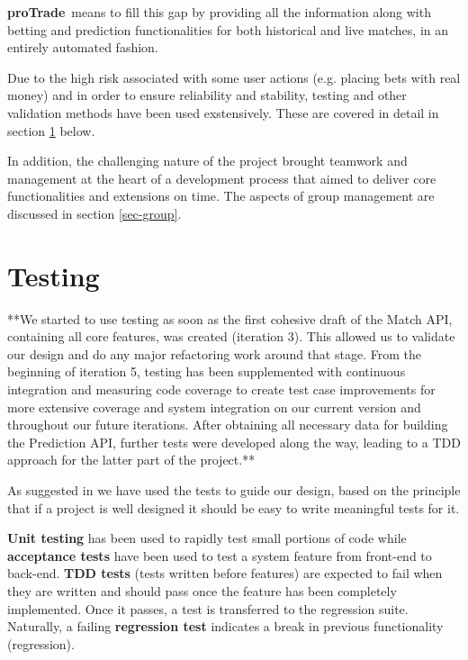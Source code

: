 \documentclass[10pt]{article}
\newcommand{\nm}{{\bf proTrade}}
\newcommand{\nmsp}{{\nm \ }}
\begin{document}
\nmsp means to fill this gap by providing all the information along with betting and prediction functionalities for both historical and live matches, in an entirely automated fashion.

Due to the high risk associated with some user actions (e.g. placing bets with real money) and in order to ensure reliability and stability, testing and other validation methods have been used exstensively. These are covered in detail in section \ref{sec-testing} below.

In addition, the challenging nature of the project brought teamwork and management at the heart of a development process that aimed to deliver core functionalities and extensions on time. The aspects of group management are discussed in section \ref{sec-group}.

\clearpage

\section{Testing}
\label{sec-testing}

**We started to use testing as soon as the first cohesive draft of the Match API, containing all core features, was created (iteration 3). This allowed us to validate our design and do any major refactoring work around that stage. From the beginning of iteration 5, testing has been supplemented with continuous integration and measuring code coverage to create test case improvements for more extensive coverage and system integration on our current version and throughout our future iterations. After obtaining all necessary data for building the Prediction API, further tests were developed along the way, leading to a TDD approach for the latter part of the project.**

As suggested in \cite{bk-testing} we have used the tests to guide our design, based on the principle that if a project is well designed it should be easy to write meaningful tests for it.

\textbf{Unit testing} has been used to rapidly test small portions of code while \textbf{acceptance tests} have been used to test a system feature from front-end to back-end. \textbf {TDD tests} (tests written before features) are expected to fail when they are written and should pass once the feature has been completely implemented. Once it passes, a test is transferred to the regression suite. Naturally, a failing \textbf{regression test} indicates a break in previous functionality (regression).
\end{document}
